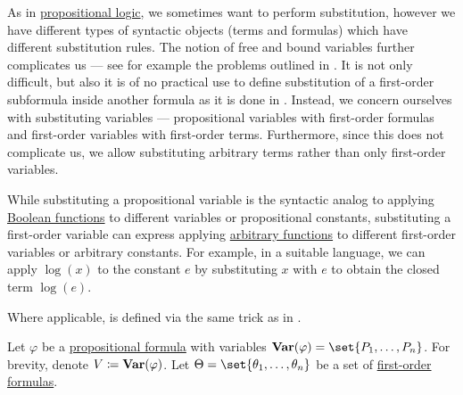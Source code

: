 \begin{definition}\label{def:first_order_substitution}
  As in \hyperref[sec:propositional_logic]{propositional logic}, we sometimes want to perform substitution, however we have different types of syntactic objects (terms and formulas) which have different substitution rules. The notion of free and bound variables further complicates us --- see for example the problems outlined in . It is not only difficult, but also it is of no practical use to define substitution of a first-order subformula inside another formula as it is done in . Instead, we concern ourselves with substituting variables --- propositional variables with first-order formulas and first-order variables with first-order terms. Furthermore, since this does not complicate us, we allow substituting arbitrary terms rather than only first-order variables.

  While substituting a propositional variable is the syntactic analog to applying \hyperref[def:boolean_function]{Boolean functions} to different variables or propositional constants, substituting a first-order variable can express applying \hyperref[def:function]{arbitrary functions} to different first-order variables or arbitrary constants. For example, in a suitable language, we can apply \( \log(x) \) to the constant \( e \) by substituting \( x \) with \( e \) to obtain the closed term \( \log(e) \).

  Where applicable,  is defined via the same trick as in .

  \begin{thmenum}
     Let \( \varphi \) be a \hyperref[def:propositional_syntax/formula]{propositional formula} with variables \( \op*{Var}(\varphi) = \set{ P_1, \ldots, P_n } \). For brevity, denote \( V \coloneqq \op*{Var}(\varphi) \). Let \( \Theta = \set{ \theta_1, \ldots, \theta_n } \) be a set of \hyperref[def:first_order_syntax/formula]{first-order formulas}.


\end{thmenum}
\end{definition}
